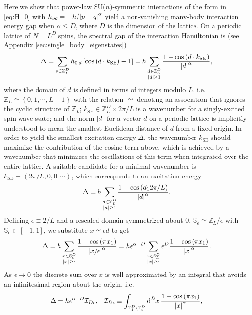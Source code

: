 \documentclass[nofootinbib,notitlepage,11pt]{revtex4-2}
\renewcommand{\t}{\text} %
\newcommand{\f}[2]{\dfrac{#1}{#2}} %
\newcommand{\p}[1]{\left(#1\right)} %
\renewcommand{\sp}[1]{\left[#1\right]} %
\renewcommand{\set}[1]{\left\{#1\right\}} %
\renewcommand{\c}{\cdot} %
\newcommand{\1}{\mathds{1}}
\renewcommand{\d}{\text{d}}
\newcommand{\I}{\mathcal{I}}
\renewcommand{\SS}{\mathbb{S}}
\newcommand{\TT}{\mathbb{T}}
\newcommand{\ZZ}{\mathbb{Z}}
\begin{document}
Here we show that power-law SU($n$)-symmetric interactions of the form
in \eqref{eq:H_0} with $h_{pq}=-h/\abs{p-q}^\alpha$ yield a
non-vanishing many-body interaction energy gap when $\alpha\le D$,
where $D$ is the dimension of the lattice.  On a periodic lattice of
$N=L^D$ spins, the spectral gap of the interaction Hamiltonian is (see
Appendix \ref{sec:single_body_eigenstates})
\begin{align}
  \Delta
  = \sum_{d\in\ZZ_L^D} h_{0,d} \sp{\cos\p{d \c k_{\t{SE}}}-1}
  = h \sum_{\substack{d\in\ZZ_L^D\\\abs{d}\ge1}}
  \f{1-\cos\p{d \c k_{\t{SE}}}}{\abs{d}^\alpha},
\end{align}
where the domain of $d$ is defined in terms of integers modulo $L$,
i.e.~$\ZZ_L\simeq\set{0,1,\cdots,L-1}$ with the relation $\simeq$
denoting an association that ignores the cyclic structure of $\ZZ_L$;
$k_{\t{SE}}\in\ZZ_L^D\times2\pi/L$ is a wavenumber for a
singly-excited spin-wave state; and the norm $\abs{d}$ for a vector
$d$ on a periodic lattice is implicitly understood to mean the
smallest Euclidean distance of $d$ from a fixed origin.  In order to
yield the smallest excitation energy $\Delta$, the wavenumber
$k_{\t{SE}}$ should maximize the contribution of the cosine term
above, which is achieved by a wavenumber that minimizes the
oscillations of this term when integrated over the entire lattice.  A
suitable candidate for a minimal wavenumber is
$k_{\t{SE}}=\p{2\pi/L,0,0,\cdots}$, which corresponds to an excitation
energy
\begin{align}
  \Delta = h \sum_{\substack{d\in\ZZ_L^D\\\abs{d}\ge1}}
  \f{1-\cos\p{d_12\pi/L}}{\abs{d}^\alpha}.
\end{align}
Defining $\epsilon\equiv2/L$ and a rescaled domain symmetrized about
$0$, $\SS_\epsilon\simeq\ZZ_L/\epsilon$ with
$\SS_\epsilon\subset\sp{-1,1}$, we substitute $x\simeq\epsilon d$ to
get
\begin{align}
  \Delta
  = h \sum_{\substack{x\in\SS_\epsilon^D\\\abs{x}\ge\epsilon}}
  \f{1-\cos\p{\pi x_1}}{\abs{x/\epsilon}^\alpha}
  = h \epsilon^{\alpha-D} \sum_{\substack{x\in\SS_L^D\\\abs{x}\ge\epsilon}}
  \epsilon^D \f{1-\cos\p{\pi x_1}}{\abs{x}^\alpha}.
\end{align}
As $\epsilon\to0$ the discrete sum over $x$ is well approximated by an
integral that avoids an infinitesimal region about the origin, i.e.
\begin{align}
  \Delta = h \epsilon^{\alpha-D} \I_{D\epsilon},
  &&
  \I_{D\epsilon}
  \equiv \int_{\TT_1^D\setminus\TT_\epsilon^D} \d^Dx\,
  \f{1-\cos\p{\pi x_1}}{\abs{x}^\alpha},
\end{align}
\end{document}
